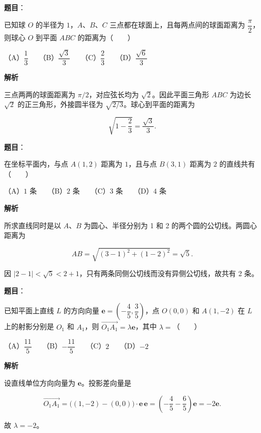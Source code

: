 \begin{answer}

\textbf{题目}：

已知球 $O$ 的半径为 $1$，$A\text{、}B\text{、}C$ 三点都在球面上，且每两点间的球面距离为 $\dfrac\pi2$，则球心 $O$ 到平面 $ABC$ 的距离为\mbox{（　　）}

（A）$\dfrac13$　　（B）$\dfrac{\sqrt3}{3}$　　（C）$\dfrac23$　　（D）$\dfrac{\sqrt6}{3}$

\textbf{解析}

三点两两的球面距离为 $\pi/2$，对应弦长均为 $\sqrt2$。因此平面三角形 $ABC$ 为边长 $\sqrt2$ 的正三角形，外接圆半径为 $\sqrt{2/3}$。球心到平面的距离为

\nopagebreak[4]
\[
\sqrt{1-\frac23}=\frac{\sqrt3}{3}.
\]


\end{answer}
\begin{answer}

\textbf{题目}：

在坐标平面内，与点 $A(1,2)$ 距离为 $1$，且与点 $B(3,1)$ 距离为 $2$ 的直线共有\mbox{（　　）}

（A）$1$ 条　　（B）$2$ 条　　（C）$3$ 条　　（D）$4$ 条

\textbf{解析}

所求直线同时是以 $A\text{、}B$ 为圆心、半径分别为 1 和 2 的两个圆的公切线。两圆心距离为

\nopagebreak[4]
\[
AB=\sqrt{(3-1)^2+(1-2)^2}=\sqrt5.
\]

因 $|2-1|<\sqrt5<2+1$，只有两条同侧公切线而没有异侧公切线，故共有 2 条。


\end{answer}
\begin{answer}

\textbf{题目}：

已知平面上直线 $L$ 的方向向量 $\boldsymbol e=\left(-\dfrac45,\dfrac35\right)$，点 $O(0,0)$ 和 $A(1,-2)$ 在 $L$ 上的射影分别是 $O_1$ 和 $A_1$，则 $\overrightarrow{O_1A_1}=\lambda\boldsymbol e$，其中 $\lambda=$\mbox{（　　）}

（A）$\dfrac{11}{5}$　　（B）$-\dfrac{11}{5}$　　（C）$2$　　（D）$-2$

\textbf{解析}

设直线单位方向向量为 $\boldsymbol e$。投影差向量是

\nopagebreak[4]
\[
\overrightarrow{O_1A_1}
=\bigl((1,-2)-(0,0)\bigr)\cdot\boldsymbol e\,\boldsymbol e
=\left(-\frac45-\frac65\right)\boldsymbol e
=-2\boldsymbol e.
\]

故 $\lambda=-2$。


\end{answer}
